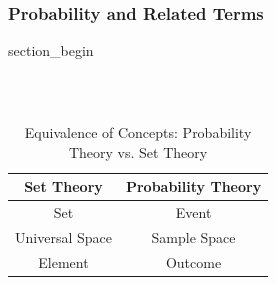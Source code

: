 \subsubsection{Probability and Related Terms}
\begin{frame} \vfill \centering \begin{beamercolorbox}[sep=10pt,center,shadow=false,rounded=true]{section_begin} \insertsubsubsectionhead\par \end{beamercolorbox} \vfill \end{frame}

\begin{frame}[t]
\frametitle{\ }
\begin{table}[]
    \centering
    \caption{Equivalence of Concepts: Probability Theory vs. Set Theory}
    \label{tab:placeholder}
    \begin{tabular}{cc}
    \hline
        \textbf{Set Theory} & \textbf{Probability Theory} \\
    \hline
        Set & Event \\
        Universal Space & Sample Space \\
        Element & Outcome \\
        \hline
    \end{tabular}
\end{table}
\end{frame}

